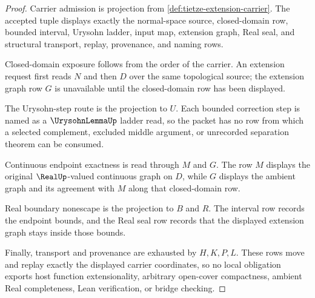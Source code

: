 \begin{proof}
Carrier admission is projection from \autoref{def:tietze-extension-carrier}. The accepted tuple displays exactly the normal-space source, closed-domain row, bounded interval, Urysohn ladder, input map, extension graph, Real seal, and structural transport, replay, provenance, and naming rows.

Closed-domain exposure follows from the order of the carrier. An extension request first reads $N$ and then $D$ over the same topological source; the extension graph row $G$ is unavailable until the closed-domain row has been displayed.

The Urysohn-step route is the projection to $U$. Each bounded correction step is named as a $\UrysohnLemmaUp$ ladder read, so the packet has no row from which a selected complement, excluded middle argument, or unrecorded separation theorem can be consumed.

Continuous endpoint exactness is read through $M$ and $G$. The row $M$ displays the original $\RealUp$-valued continuous graph on $D$, while $G$ displays the ambient graph and its agreement with $M$ along that closed-domain row.

Real boundary nonescape is the projection to $B$ and $R$. The interval row records the endpoint bounds, and the Real seal row records that the displayed extension graph stays inside those bounds.

Finally, transport and provenance are exhausted by $H,K,P,L$. These rows move and replay exactly the displayed carrier coordinates, so no local obligation exports host function extensionality, arbitrary open-cover compactness, ambient Real completeness, Lean verification, or bridge checking.
\end{proof}

